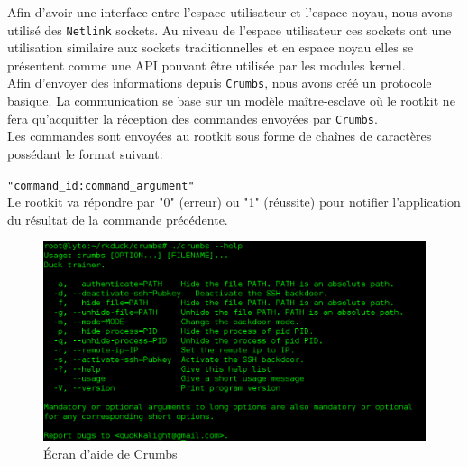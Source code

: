 \documentclass[12pt]{article}
\begin{document}
        Afin d'avoir une interface entre l'espace utilisateur et l'espace noyau, nous avons utilisé des \texttt{Netlink} sockets. Au niveau de l'espace utilisateur ces sockets ont une utilisation similaire aux sockets traditionnelles et en espace noyau elles se présentent comme une API pouvant être utilisée par les modules kernel. \\

        Afin d'envoyer des informations depuis \texttt{Crumbs}, nous avons créé un protocole basique. La communication se base sur un modèle maître-esclave où le rootkit ne fera qu'acquitter la réception des commandes envoyées par \texttt{Crumbs}. \\
        Les commandes sont envoyées au rootkit sous forme de chaînes de caractères possédant le format suivant:

        \texttt{"command\_id:command\_argument"}\\
        Le rootkit va répondre par "0" (erreur) ou "1" (réussite) pour notifier l'application du résultat de la commande précédente.

        \begin{figure}[H] 
        \begin{center}
        \includegraphics[scale=0.5]{./img/crumbs-help.png}

        \caption[dsfsdf]{Écran d'aide de Crumbs}
        \end{center}
        \end{figure}
\end{document}
